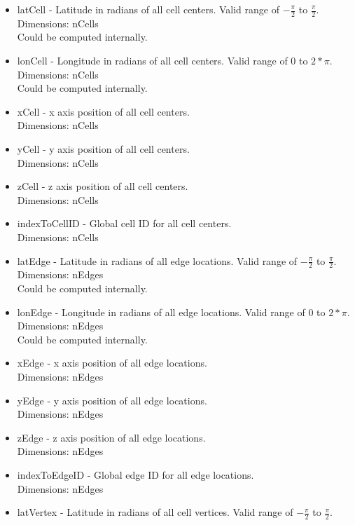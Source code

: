 \documentclass[11pt]{report}
\begin{document}
\begin{itemize}
	\item latCell - Latitude in radians of all cell centers. Valid range of $-\frac{\pi}{2}$ to $\frac{\pi}{2}$.\\
		  Dimensions: nCells \\
		  Could be computed internally. 
	\item lonCell - Longitude in radians of all cell centers. Valid range of $0$ to $2*\pi$. \\
		  Dimensions: nCells \\
		  Could be computed internally. 
	\item xCell - x axis position of all cell centers. \\
		  Dimensions: nCells
	\item yCell - y axis position of all cell centers. \\
		  Dimensions: nCells
	\item zCell - z axis position of all cell centers. \\
		  Dimensions: nCells
	\item indexToCellID - Global cell ID for all cell centers. \\
		  Dimensions: nCells
	\item latEdge - Latitude in radians of all edge locations. Valid range of $-\frac{\pi}{2}$ to $\frac{\pi}{2}$. \\
		  Dimensions: nEdges \\
		  Could be computed internally. 
	\item lonEdge - Longitude in radians of all edge locations. Valid range of $0$ to $2*\pi$. \\
		  Dimensions: nEdges \\
		  Could be computed internally. 
	\item xEdge - x axis position of all edge locations. \\
		  Dimensions: nEdges
	\item yEdge - y axis position of all edge locations. \\
		  Dimensions: nEdges
	\item zEdge - z axis position of all edge locations. \\
		  Dimensions: nEdges
	\item indexToEdgeID - Global edge ID for all edge locations. \\
		  Dimensions: nEdges
	\item latVertex - Latitude in radians of all cell vertices. Valid range of $-\frac{\pi}{2}$ to $\frac{\pi}{2}$. \\

\end{itemize}
\end{document}
